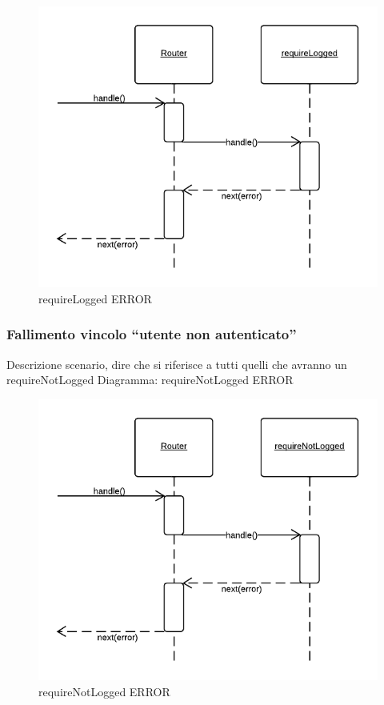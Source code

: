 \begin{figure}[H]
	\begin{center} 
		\includegraphics[scale=0.60]{scenari/requireLogged ERROR.png} 
		\caption{requireLogged ERROR}
	\end{center} 
\end{figure}

\subsubsection{Fallimento vincolo ``utente non autenticato''}
Descrizione scenario, dire che si riferisce a tutti quelli che avranno un requireNotLogged
Diagramma: requireNotLogged ERROR
\begin{figure}[H]
	\begin{center} 
		\includegraphics[scale=0.60]{scenari/requireNotLogged ERROR.png} 
		\caption{requireNotLogged ERROR}
	\end{center} 
\end{figure}


